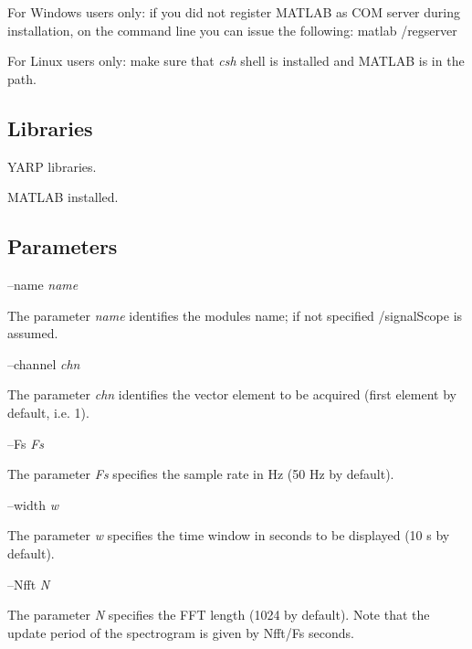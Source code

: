 For Windows users only\+: if you did not register M\+A\+T\+L\+A\+B as C\+O\+M server during installation, on the command line you can issue the following\+: matlab /regserver

For Linux users only\+: make sure that {\itshape csh} shell is installed and M\+A\+T\+L\+A\+B is in the path.\hypertarget{group__icub__tld_lib_sec}{}\subsection{Libraries}\label{group__icub__tld_lib_sec}

\begin{DoxyItemize}
\item Y\+A\+R\+P libraries.
\item M\+A\+T\+L\+A\+B installed.
\end{DoxyItemize}\hypertarget{group__icub__tld_parameters_sec}{}\subsection{Parameters}\label{group__icub__tld_parameters_sec}
--name {\itshape name} 
\begin{DoxyItemize}
\item The parameter {\itshape name} identifies the module\textquotesingle{}s name; if not specified /signal\+Scope is assumed.
\end{DoxyItemize}

--channel {\itshape chn} 
\begin{DoxyItemize}
\item The parameter {\itshape chn} identifies the vector element to be acquired (first element by default, i.\+e. 1).
\end{DoxyItemize}

--Fs {\itshape Fs} 
\begin{DoxyItemize}
\item The parameter {\itshape Fs} specifies the sample rate in Hz (50 Hz by default).
\end{DoxyItemize}

--width {\itshape w} 
\begin{DoxyItemize}
\item The parameter {\itshape w} specifies the time window in seconds to be displayed (10 s by default).
\end{DoxyItemize}

--Nfft {\itshape N} 
\begin{DoxyItemize}
\item The parameter {\itshape N} specifies the F\+F\+T length (1024 by default). Note that the update period of the spectrogram is given by Nfft/\+Fs seconds.
\end{DoxyItemize}


